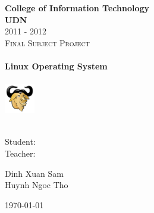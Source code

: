\begin{titlepage}
	\begin{center}
		\huge{\textbf{College of Information Technology}} \\
		\textbf{\Large{UDN}} \\
		2011 - 2012 \\[1.5cm]
		\textsc{\Large Final Subject Project} \\ [0.5cm]
		\HRule \\[0.5cm]
		\textbf{\Huge{Linux Operating System}} \\[0.5cm]
		\HRule \\[0.5cm]
		\includegraphics{./pics/gnu.png} \\ 
		\hrulefill \\ [1.5cm]
		\begin{minipage}{0.4\textwidth}
			\begin{flushleft}
				\large{Student:} \\
				\large{Teacher:} \\
			\end{flushleft}
		\end{minipage}
		\begin{minipage}{0.4\textwidth}
			\begin{flushleft}
				\normalsize{Dinh Xuan Sam} \\
				\normalsize{Huynh Ngoc Tho}
			\end{flushleft}
		\end{minipage}
		\vfill
		{\large \today}
	\end{center}
\end{titlepage}

